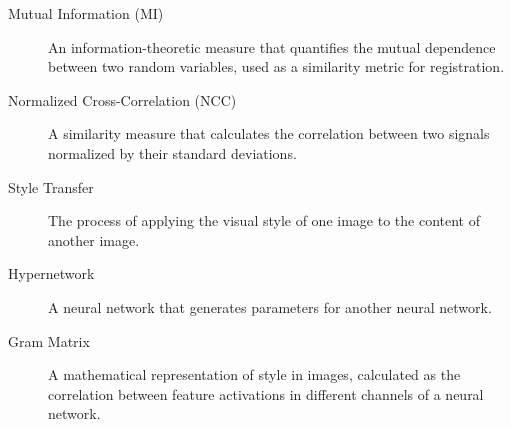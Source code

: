 \begin{appendices}
\begin{description}
    \item[Mutual Information (MI)] An information-theoretic measure that quantifies the mutual dependence between two random variables, used as a similarity metric for registration.
    
    \item[Normalized Cross-Correlation (NCC)] A similarity measure that calculates the correlation between two signals normalized by their standard deviations.
    
    \item[Style Transfer] The process of applying the visual style of one image to the content of another image.
    
    \item[Hypernetwork] A neural network that generates parameters for another neural network.
    
    \item[Gram Matrix] A mathematical representation of style in images, calculated as the correlation between feature activations in different channels of a neural network.
\end{description}

\end{appendices}
